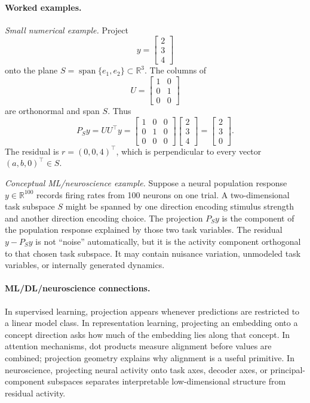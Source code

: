 \paragraph{Worked examples.}
\emph{Small numerical example.} Project
\[
y=\begin{bmatrix}2\\3\\4\end{bmatrix}
\]
onto the plane \(S=\operatorname{span}\{e_1,e_2\}\subset\mathbb{R}^3\). The columns of
\[
U=
\begin{bmatrix}
1&0\\
0&1\\
0&0
\end{bmatrix}
\]
are orthonormal and span \(S\). Thus
\[
P_Sy=UU^\top y
=
\begin{bmatrix}
1&0&0\\
0&1&0\\
0&0&0
\end{bmatrix}
\begin{bmatrix}2\\3\\4\end{bmatrix}
=
\begin{bmatrix}2\\3\\0\end{bmatrix}.
\]
The residual is \(r=(0,0,4)^\top\), which is perpendicular to every vector \((a,b,0)^\top\in S\).

\emph{Conceptual ML/neuroscience example.} Suppose a neural population response \(y\in\mathbb{R}^{100}\) records firing rates from 100 neurons on one trial. A two-dimensional task subspace \(S\) might be spanned by one direction encoding stimulus strength and another direction encoding choice. The projection \(P_Sy\) is the component of the population response explained by those two task variables. The residual \(y-P_Sy\) is not ``noise'' automatically, but it is the activity component orthogonal to that chosen task subspace. It may contain nuisance variation, unmodeled task variables, or internally generated dynamics.

\paragraph{ML/DL/neuroscience connections.}
In supervised learning, projection appears whenever predictions are restricted to a linear model class. In representation learning, projecting an embedding onto a concept direction asks how much of the embedding lies along that concept. In attention mechanisms, dot products measure alignment before values are combined; projection geometry explains why alignment is a useful primitive. In neuroscience, projecting neural activity onto task axes, decoder axes, or principal-component subspaces separates interpretable low-dimensional structure from residual activity.

